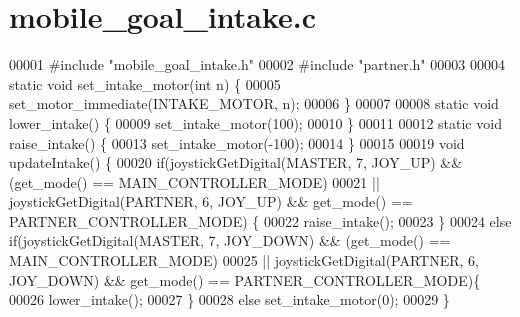 \section{mobile\+\_\+goal\+\_\+intake.\+c}
\label{mobile__goal__intake_8c_source}

\begin{DoxyCode}
00001 \textcolor{preprocessor}{#include "mobile_goal_intake.h"}
00002 \textcolor{preprocessor}{#include "partner.h"}
00003 
00004 \textcolor{keyword}{static} \textcolor{keywordtype}{void} set_intake_motor(\textcolor{keywordtype}{int} n) \{
00005   set_motor_immediate(INTAKE_MOTOR, n);
00006 \}
00007 
00008 \textcolor{keyword}{static} \textcolor{keywordtype}{void} lower_intake() \{
00009   set_intake_motor(100);
00010 \}
00011 
00012 \textcolor{keyword}{static} \textcolor{keywordtype}{void} raise_intake() \{
00013   set_intake_motor(-100);
00014 \}
00015 
00019 \textcolor{keywordtype}{void} updateIntake() \{
00020   \textcolor{keywordflow}{if}(joystickGetDigital(MASTER, 7, JOY\_UP) && (get_mode() == 
      MAIN_CONTROLLER_MODE)
00021   || joystickGetDigital(PARTNER, 6, JOY\_UP) && get_mode() == 
      PARTNER_CONTROLLER_MODE) \{
00022     raise_intake();
00023   \}
00024   \textcolor{keywordflow}{else} \textcolor{keywordflow}{if}(joystickGetDigital(MASTER, 7, JOY\_DOWN) && (get_mode() == 
      MAIN_CONTROLLER_MODE)
00025   || joystickGetDigital(PARTNER, 6, JOY\_DOWN) && get_mode() == 
      PARTNER_CONTROLLER_MODE)\{
00026     lower_intake();
00027   \}
00028   \textcolor{keywordflow}{else} set_intake_motor(0);
00029 \}
\end{DoxyCode}
